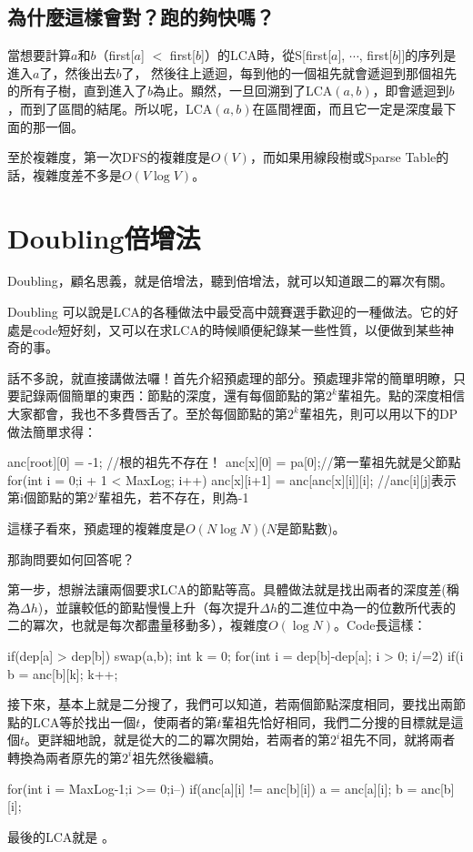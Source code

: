 			\subsection{為什麼這樣會對？跑的夠快嗎？}
				當想要計算$a$和$b$（first[$a$] $< $ first[$b$]）的LCA時，從S[first[$a$], $\cdots$, first[$b$]]的序列是進入$a$了，然後出去$b$了， 然後往上遞迴，每到他的一個祖先就會遞迴到那個祖先的所有子樹，直到進入了$b$為止。顯然，一旦回溯到了LCA$(a, b)$，即會遞迴到$b$，而到了區間的結尾。所以呢，LCA$(a, b)$在區間裡面，而且它一定是深度最下面的那一個。
				
				至於複雜度，第一次DFS的複雜度是$O(V)$，而如果用線段樹或Sparse Table的話，複雜度差不多是$O(V\log V)$。
	\section{Doubling倍增法}
		Doubling，顧名思義，就是倍增法，聽到倍增法，就可以知道跟二的冪次有關。
		
		Doubling 可以說是LCA的各種做法中最受高中競賽選手歡迎的一種做法。它的好處是code短好刻，又可以在求LCA的時候順便紀錄某一些性質，以便做到某些神奇的事。
		
		話不多說，就直接講做法囉！首先介紹預處理的部分。預處理非常的簡單明瞭，只要記錄兩個簡單的東西：節點的深度，還有每個節點的第$2^k $輩祖先。點的深度相信大家都會，我也不多費唇舌了。至於每個節點的第$2^k $輩祖先，則可以用以下的DP做法簡單求得：
\begin{C++}
anc[root][0] = -1; //根的祖先不存在！
anc[x][0] = pa[0];//第一輩祖先就是父節點 
for(int i = 0;i + 1 < MaxLog; i++)
{
	anc[x][i+1] = anc[anc[x][i]][i]; //anc[i][j]表示第i個節點的第$2^j $輩祖先，若不存在，則為-1
}
\end{C++}
		這樣子看來，預處理的複雜度是$O(N\log N)$($N$是節點數)。
		
		那詢問要如何回答呢？
		
		第一步，想辦法讓兩個要求LCA的節點等高。具體做法就是找出兩者的深度差(稱為$\Delta h$)，並讓較低的節點慢慢上升（每次提升$\Delta h$的二進位中為一的位數所代表的二的冪次，也就是每次都盡量移動多），複雜度$O(\log N)$。Code長這樣：
\begin{C++}
if(dep[a] > dep[b])
	swap(a,b);
int k  = 0;
for(int i = dep[b]-dep[a]; i > 0; i/=2)
{
	if(i %
		b = anc[b][k];
	k++;
}
\end{C++}
		接下來，基本上就是二分搜了，我們可以知道，若兩個節點深度相同，要找出兩節點的LCA等於找出一個$t$，使兩者的第$t$輩祖先恰好相同，我們二分搜的目標就是這個$t$。更詳細地說，就是從大的二的冪次開始，若兩者的第$2^i$祖先不同，就將兩者轉換為兩者原先的第$2^i$祖先然後繼續。
		\begin{C++}
for(int i = MaxLog-1;i >= 0;i--)
{
	if(anc[a][i] != anc[b][i])
	{
		a = anc[a][i];
		b = anc[b][i];
	}
}
		\end{C++}
		最後的LCA就是 。
		
